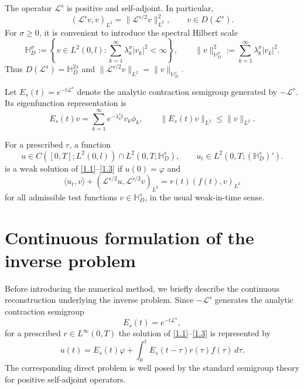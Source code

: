 \documentclass[reqno]{amsart}
\newcommand{\Lcal}{\mathcal L}
\begin{document}
The operator $\Lcal^s$ is positive and self-adjoint. In particular,
\begin{equation}\label{eq:spectral-energy}
 (\Lcal^s v,v)_{L^2}=\|\Lcal^{s/2}v\|_{L^2}^2,
 \qquad v\in D(\Lcal^s).
\end{equation}
For $\sigma\ge0$, it is convenient to introduce the spectral Hilbert scale
\begin{equation}\label{eq:HsD}
 \mathbb H_D^{\sigma}
 :=\left\{v\in L^2(0,l):
 \sum_{k=1}^{\infty}\lambda_k^{\sigma}|v_k|^2<\infty\right\},
 \qquad
 \|v\|_{\mathbb H_D^{\sigma}}^2
 :=\sum_{k=1}^{\infty}\lambda_k^{\sigma}|v_k|^2.
\end{equation}
Thus $D(\Lcal^s)=\mathbb H_D^{2s}$ and
$\|\Lcal^{s/2}v\|_{L^2}=\|v\|_{\mathbb H_D^s}$.

Let $E_s(t)=e^{-t\Lcal^s}$ denote the analytic contraction semigroup generated by $-\Lcal^s$. Its eigenfunction representation is
\begin{equation}\label{eq:semigroup}
 E_s(t)v=\sum_{k=1}^{\infty}e^{-\lambda_k^s t}v_k\phi_k,
 \qquad \|E_s(t)v\|_{L^2}\le \|v\|_{L^2}.
\end{equation}

\begin{definition}
For a prescribed $r$, a function
\[
 u\in C([0,T];L^2(0,l))\cap L^2(0,T;\mathbb H_D^s),\qquad
 u_t\in L^2(0,T;(\mathbb H_D^s)').
\]
is a weak solution of \eqref{1.1}--\eqref{1.3} if $u(0)=\varphi$ and
\begin{equation}\label{eq:weak}
 \langle u_t,v\rangle
 +(\Lcal^{s/2}u,\Lcal^{s/2}v)_{L^2}
 =r(t)(f(t),v)_{L^2}
\end{equation}
for all admissible test functions $v\in\mathbb H_D^s$, in the usual weak-in-time sense.
\end{definition}


\section{Continuous formulation of the inverse problem}\label{3}

Before introducing the numerical method, we briefly describe the continuous
reconstruction underlying the inverse problem. Since $-\mathcal L^s$
generates the analytic contraction semigroup
\[
E_s(t)=e^{-t\mathcal L^s},
\]
for a prescribed $r\in L^\infty(0,T)$ the solution of
\eqref{1.1}--\eqref{1.3} is represented by
\begin{equation}\label{eq:mild-solution}
u(t)
=
E_s(t)\varphi
+
\int_0^t
E_s(t-\tau)r(\tau)f(\tau)\,d\tau .
\end{equation}
The corresponding direct problem is well posed by the standard semigroup
theory for positive self-adjoint operators.
\end{document}
